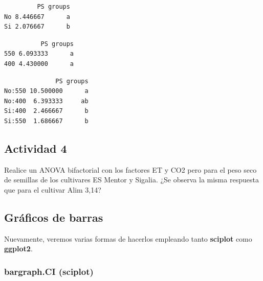 \documentclass[
  letterpaper,
  DIV=11,
  numbers=noendperiod]{scrartcl}
\newenvironment{Shaded}{\begin{snugshade}}{\end{snugshade}}
\newcommand{\FunctionTok}[1]{\textcolor[rgb]{0.28,0.35,0.67}{#1}}
\newcommand{\NormalTok}[1]{\textcolor[rgb]{0.00,0.23,0.31}{#1}}
\newcommand{\OtherTok}[1]{\textcolor[rgb]{0.00,0.23,0.31}{#1}}
\newcommand{\SpecialCharTok}[1]{\textcolor[rgb]{0.37,0.37,0.37}{#1}}
\newcommand{\StringTok}[1]{\textcolor[rgb]{0.13,0.47,0.30}{#1}}
\begin{document}
\begin{verbatim}
         PS groups
No 8.446667      a
Si 2.076667      b
\end{verbatim}

\begin{Shaded}
\end{Shaded}

\begin{verbatim}
          PS groups
550 6.093333      a
400 4.430000      a
\end{verbatim}

\begin{Shaded}
\end{Shaded}

\begin{verbatim}
              PS groups
No:550 10.500000      a
No:400  6.393333     ab
Si:400  2.466667      b
Si:550  1.686667      b
\end{verbatim}

\hypertarget{actividad-4}{%
\subsection{Actividad 4}\label{actividad-4}}

Realice un ANOVA bifactorial con los factores ET y CO2 pero para el peso
seco de semillas de los cultivares ES Mentor y Sigalia. ¿Se observa la
misma respuesta que para el cultivar Alim 3,14?

\hypertarget{gruxe1ficos-de-barras}{%
\subsection{Gráficos de barras}\label{gruxe1ficos-de-barras}}

Nuevamente, veremos varias formas de hacerlos empleando tanto
\textbf{sciplot} como \textbf{ggplot2}.

\hypertarget{bargraph.ci-sciplot}{%
\subsubsection{bargraph.CI (sciplot)}\label{bargraph.ci-sciplot}}
\end{document}
